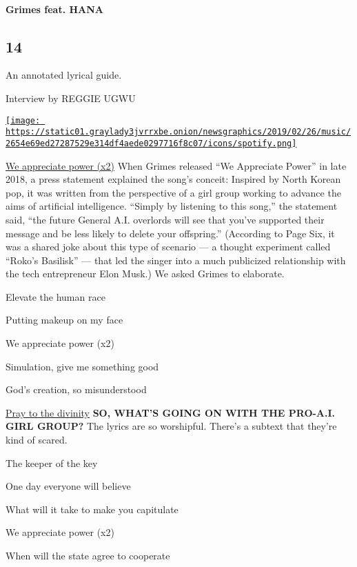 \hypertarget{grimes-feat-hana}{%
\paragraph{Grimes feat. HANA}\label{grimes-feat-hana}}

\hypertarget{14}{%
\subsection{14}\label{14}}

An annotated lyrical guide.

Interview by REGGIE UGWU

\href{https://open.spotify.com/track/08ZCgkLKpcgrcSPCHN2v8J}{\texttt{[image: https://static01.graylady3jvrrxbe.onion/newsgraphics/2019/02/26/music/2654e69ed27287529e314df4aede0297716f8c07/icons/spotify.png]}}

\href{http://nytimes3xbfgragh.onion\#tooltip-1}{We appreciate power
(x2)} When Grimes released ``We Appreciate Power'' in late 2018, a press
statement explained the song's conceit: Inspired by North Korean pop, it
was written from the perspective of a girl group working to advance the
aims of artificial intelligence. ``Simply by listening to this song,''
the statement said, ``the future General A.I. overlords will see that
you've supported their message and be less likely to delete your
offspring.'' (According to Page Six, it was a shared joke about this
type of scenario --- a thought experiment called ``Roko's Basilisk'' ---
that led the singer into a much publicized relationship with the tech
entrepreneur Elon Musk.) We asked Grimes to elaborate.

Elevate the human race

Putting makeup on my face

We appreciate power (x2)

Simulation, give me something good

God's creation, so misunderstood

\href{http://nytimes3xbfgragh.onion\#tooltip-2}{Pray to the divinity}
\textbf{SO, WHAT'S GOING ON WITH THE PRO-A.I. GIRL GROUP?} The lyrics
are so worshipful. There's a subtext that they're kind of scared.

The keeper of the key

One day everyone will believe

What will it take to make you capitulate

We appreciate power (x2)

When will the state agree to cooperate

